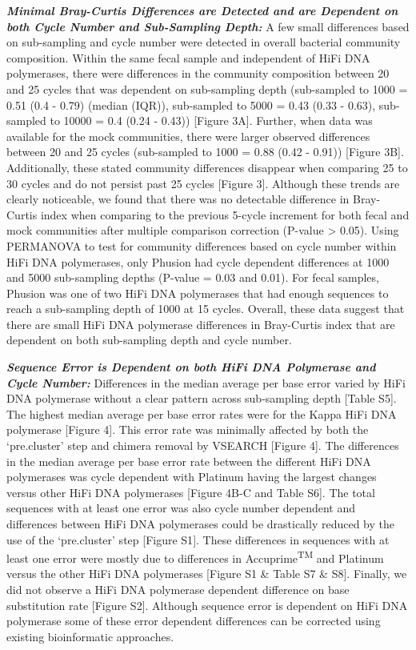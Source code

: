 \documentclass[12pt,]{article}
\begin{document}
\textbf{\emph{Minimal Bray-Curtis Differences are Detected and are
Dependent on both Cycle Number and Sub-Sampling Depth:}} A few small
differences based on sub-sampling and cycle number were detected in
overall bacterial community composition. Within the same fecal sample
and independent of HiFi DNA polymerases, there were differences in the
community composition between 20 and 25 cycles that was dependent on
sub-sampling depth (sub-sampled to 1000 = 0.51 (0.4 - 0.79) (median
(IQR)), sub-sampled to 5000 = 0.43 (0.33 - 0.63), sub-sampled to 10000 =
0.4 (0.24 - 0.43)) {[}Figure 3A{]}. Further, when data was available for
the mock communities, there were larger observed differences between 20
and 25 cycles (sub-sampled to 1000 = 0.88 (0.42 - 0.91)) {[}Figure
3B{]}. Additionally, these stated community differences disappear when
comparing 25 to 30 cycles and do not persist past 25 cycles {[}Figure
3{]}. Although these trends are clearly noticeable, we found that there
was no detectable difference in Bray-Curtis index when comparing to the
previous 5-cycle increment for both fecal and mock communities after
multiple comparison correction (P-value \textgreater{} 0.05). Using
PERMANOVA to test for community differences based on cycle number within
HiFi DNA polymerases, only Phusion had cycle dependent differences at
1000 and 5000 sub-sampling depths (P-value = 0.03 and 0.01). For fecal
samples, Phusion was one of two HiFi DNA polymerases that had enough
sequences to reach a sub-sampling depth of 1000 at 15 cycles. Overall,
these data suggest that there are small HiFi DNA polymerase differences
in Bray-Curtis index that are dependent on both sub-sampling depth and
cycle number.

\textbf{\emph{Sequence Error is Dependent on both HiFi DNA Polymerase
and Cycle Number:}} Differences in the median average per base error
varied by HiFi DNA polymerase without a clear pattern across
sub-sampling depth {[}Table S5{]}. The highest median average per base
error rates were for the Kappa HiFi DNA polymerase {[}Figure 4{]}. This
error rate was minimally affected by both the `pre.cluster' step and
chimera removal by VSEARCH {[}Figure 4{]}. The differences in the median
average per base error rate between the different HiFi DNA polymerases
was cycle dependent with Platinum having the largest changes versus
other HiFi DNA polymerases {[}Figure 4B-C and Table S6{]}. The total
sequences with at least one error was also cycle number dependent and
differences between HiFi DNA polymerases could be drastically reduced by
the use of the `pre.cluster' step {[}Figure S1{]}. These differences in
sequences with at least one error were mostly due to differences in
Accuprime\textsuperscript{TM} and Platinum versus the other HiFi DNA
polymerases {[}Figure S1 \& Table S7 \& S8{]}. Finally, we did not
observe a HiFi DNA polymerase dependent difference on base substitution
rate {[}Figure S2{]}. Although sequence error is dependent on HiFi DNA
polymerase some of these error dependent differences can be corrected
using existing bioinformatic approaches.
\end{document}
